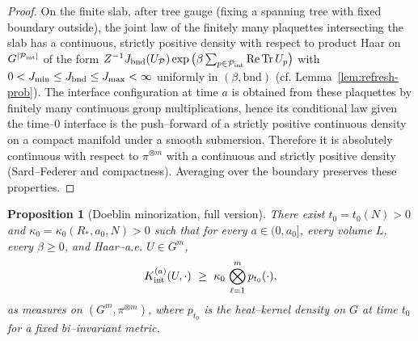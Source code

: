 \documentclass[11pt]{amsart}
\theoremstyle{plain}
\newtheorem{proposition}[theorem]{Proposition}
\theoremstyle{definition}
\theoremstyle{remark}
\begin{document}
\begin{proof}
On the finite slab, after tree gauge (fixing a spanning tree with fixed boundary outside), the joint law of the finitely many plaquettes intersecting the slab has a continuous, strictly positive density with respect to product Haar on $G^{|\mathcal P_{\rm int}|}$ of the form $Z^{-1} J_{\rm bnd}(U_{\mathcal P})\exp\big(\beta \sum_{p\in\mathcal P_{\rm int}} \mathrm{Re\,Tr}\,U_p\big)$ with $0<J_{\min}\le J_{\rm bnd}\le J_{\max}<\infty$ uniformly in $(\beta,\text{bnd})$ (cf. Lemma~\ref{lem:refresh-prob}). The interface configuration at time $a$ is obtained from these plaquettes by finitely many continuous group multiplications, hence its conditional law given the time–$0$ interface is the push–forward of a strictly positive continuous density on a compact manifold under a smooth submersion. Therefore it is absolutely continuous with respect to $\pi^{\otimes m}$ with a continuous and strictly positive density (Sard–Federer and compactness). Averaging over the boundary preserves these properties.
\end{proof}

\begin{proposition}[Doeblin minorization, full version]\label{prop:doeblin-full}
There exist $t_0=t_0(N)>0$ and $\kappa_0=\kappa_0(R_*,a_0,N)>0$ such that for every $a\in(0,a_0]$, every volume $L$, every $\beta\ge 0$, and Haar–a.e. $U\in G^m$,
\[
  K_{\rm int}^{(a)}(U,\cdot)\ \ge\ \kappa_0\, \bigotimes_{\ell=1}^m p_{t_0}(\cdot),
\]
as measures on $(G^m,\pi^{\otimes m})$, where $p_{t_0}$ is the heat–kernel density on $G$ at time $t_0$ for a fixed bi–invariant metric.
\end{proposition}
\end{document}
